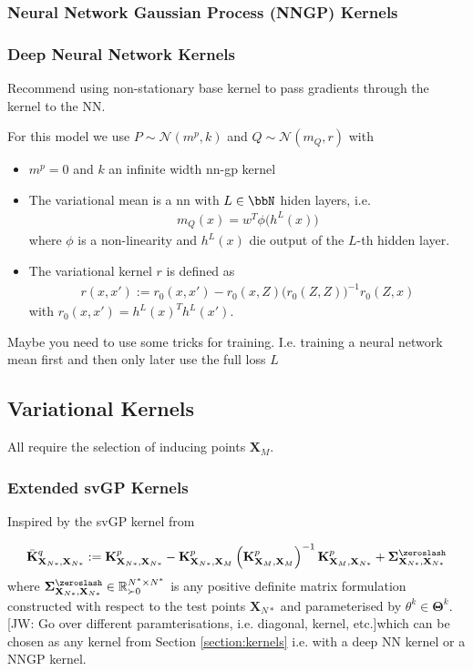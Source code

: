 \documentclass{article}
\newcommand{\jw}[1]{{\color{gray} [JW: #1]}}
\numberwithin{equation}{section}
\begin{document}
\subsubsection{Neural Network Gaussian Process (NNGP) Kernels}
\subsubsection{Deep Neural Network Kernels}
Recommend using non-stationary base kernel to pass gradients through the kernel to the NN. 

For this model we use $P \sim \mathcal{N}(m^p, k) $ and $Q \sim \mathcal{N}(m_Q, r)$ with 
\begin{itemize}
    \item $m^p = 0$ and $k$ an infinite width nn-gp kernel
    \item The variational mean is a nn with $L \in \bbN$ hiden layers, i.e. 
    \begin{align}
        m_Q(x) = w^T \phi\big( h^{L}(x) \big)
    \end{align}
    where $\phi$ is a non-linearity and $h^L(x)$ die output of the $L$-th hidden layer. 
    \item 
    The variational kernel $r$ is defined as 
    \begin{align}
        r(x,x') := r_0(x,x') - r_0(x,Z) \big( r_0(Z,Z) \big)^{-1} r_0(Z,x)
    \end{align}
    with $r_0(x,x') = h^{L}(x)^T h^{L}(x')$.
\end{itemize}
Maybe you need to use some tricks for training. I.e. training a neural network mean first and then only later use the full loss $L$

\subsection{Variational Kernels}
All require the selection of inducing points $\mathbf{X}_M$. 


\subsubsection{Extended svGP Kernels}
Inspired by the svGP kernel from \cite{titsias2009variational}

\begin{align}
            \bar{\mathbf{K}}^q_{\mathbf{X}_{N*}, \mathbf{X}_{N*}} := \mathbf{K}^p_{\mathbf{X}_{N*}, \mathbf{X}_{N*}} - \mathbf{K}^p_{\mathbf{X}_{N*}, \mathbf{X}_M}\left(\mathbf{K}^p_{\mathbf{X}_{M}, \mathbf{X}_M}\right)^{-1}\mathbf{K}^p_{\mathbf{X}_M, \mathbf{X}_{N*}} + \mathbf{\Sigma}^{\zeroslash}_{\mathbf{X}_{N*}, \mathbf{X}_{N*}} 
\end{align}
where $\mathbf{\Sigma}^{\zeroslash}_{\mathbf{X}_{N*}, \mathbf{X}_{N*}} \in \mathbb{R}^{N^*\times N^*}_{\succ 0}$ is any positive definite matrix formulation constructed with respect to the test points $\mathbf{X}_{N*}$ and parameterised by $\theta^k \in \boldsymbol{\Theta}^k$. \jw{Go over different paramterisations, i.e. diagonal, kernel, etc.}which can be chosen as any kernel from Section \ref{section:kernels} i.e. with a deep NN kernel or a NNGP kernel.
\end{document}
